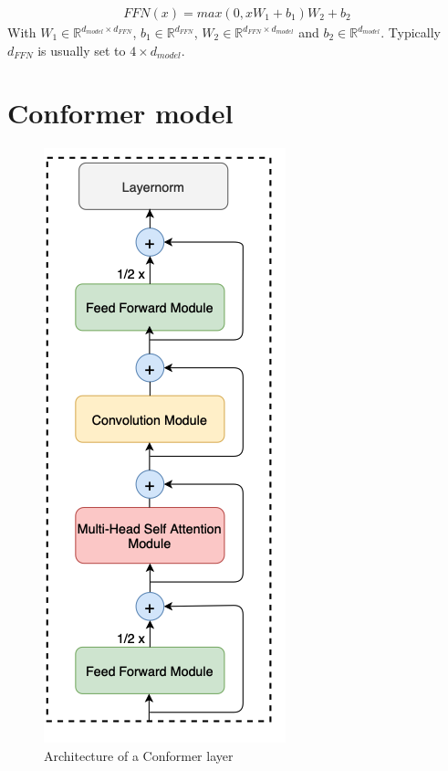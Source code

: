 \begin{align}
    FFN(x) = max(0,xW_1 + b_1)W_2 + b_2
    \label{equation:FFN}
\end{align}
With $W_1 \in \mathbb{R}^{d_{model} \times d_{FFN}}$, $b_1 \in \mathbb{R}^{d_{FFN}}$, $W_2 \in \mathbb{R}^{d_{FFN} \times d_{model}}$ and $b_2 \in \mathbb{R}^{d_{model}}$. Typically $d_{FFN}$ is usually set to $4 \times d_{model}$.

\section{Conformer model}
\label{sec:Conformer}
\begin{figure}[h]
    \centering
    \includegraphics[scale=0.4]{imgs/ConformerLayer.png}
    \caption{Architecture of a Conformer layer}
    \label{fig:Conformer_archi}
\end{figure}

